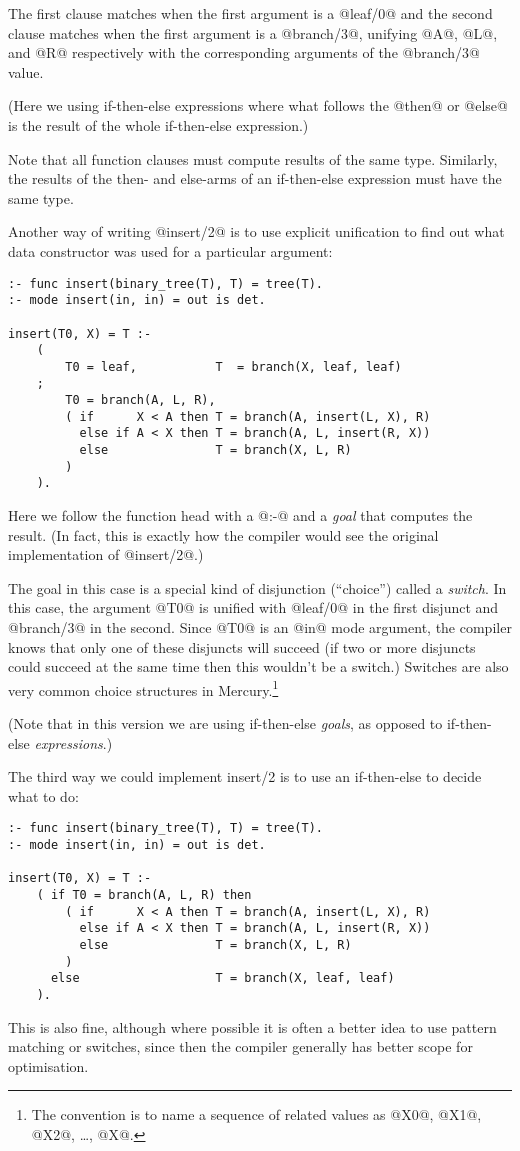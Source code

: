 The first clause matches when the first argument is a @leaf/0@
and the second clause matches when the first argument is a
@branch/3@, unifying @A@, @L@, and @R@ respectively with the
corresponding arguments of the @branch/3@ value.

(Here we using if-then-else expressions where what follows the
@then@ or @else@ is the result of the whole if-then-else
expression.)

Note that all function clauses must compute results of the
same type.  Similarly, the results of the then- and else-arms
of an if-then-else expression must have the same type.

Another way of writing @insert/2@ is to use explicit unification
to find out what data constructor was used for a particular
argument:
\begin{verbatim}
:- func insert(binary_tree(T), T) = tree(T).
:- mode insert(in, in) = out is det.

insert(T0, X) = T :-
    (
        T0 = leaf,           T  = branch(X, leaf, leaf)
    ;
        T0 = branch(A, L, R),
        ( if      X < A then T = branch(A, insert(L, X), R)
          else if A < X then T = branch(A, L, insert(R, X))
          else               T = branch(X, L, R)
        )
    ).
\end{verbatim}
Here we follow the function head with a @:-@ and a \emph{goal} that
computes the result.  (In fact, this is exactly how the
compiler would see the original implementation of @insert/2@.)

The goal in this case is a special kind of disjunction
(``choice'') called a \emph{switch}.  In this case, the argument @T0@
is unified with @leaf/0@ in the first disjunct and @branch/3@ in
the second.  Since @T0@ is an @in@ mode argument, the compiler
knows that only one of these disjuncts will succeed (if two or
more disjuncts could succeed at the same time then this
wouldn't be a switch.)  Switches are also very common choice
structures in Mercury.\footnote{The convention is to name a sequence of related
values as @X0@, @X1@, @X2@, \ldots, @X@.}

(Note that in this version we are using if-then-else \emph{goals},
as opposed to if-then-else \emph{expressions}.)

The third way we could implement insert/2 is to use an
if-then-else to decide what to do:
\begin{verbatim}
:- func insert(binary_tree(T), T) = tree(T).
:- mode insert(in, in) = out is det.

insert(T0, X) = T :-
    ( if T0 = branch(A, L, R) then
        ( if      X < A then T = branch(A, insert(L, X), R)
          else if A < X then T = branch(A, L, insert(R, X))
          else               T = branch(X, L, R)
        )
      else                   T = branch(X, leaf, leaf)
    ).
\end{verbatim}
This is also fine, although where possible it is often a
better idea to use pattern matching or switches, since then
the compiler generally has better scope for optimisation.

